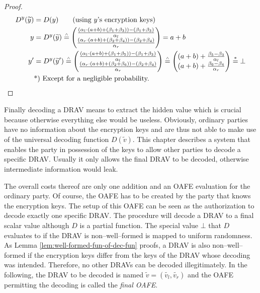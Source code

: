 \begin{proof}
  \begin{align*}
    D^y(\widetilde{y}) &= D(y) \qquad\text{(using $y$'s encryption keys)}\\
    y &= D^y(\widetilde{y}) \stackrel{\scriptscriptstyle\wedge}{=}
    \begin{pmatrix}
      \frac{(\alpha_l \cdot (a+b) + (\beta_1 + \beta_3)) - (\beta_1+\beta_3)}
           {\alpha_l}\\
      \frac{(\alpha_r \cdot (a+b) + (\beta_2 + \beta_4)) - (\beta_2+\beta_4)}
           {\alpha_r}\\
    \end{pmatrix}
    = a+b\\
    y' &= D^y(\widetilde{y}')
    \stackrel{\scriptscriptstyle\wedge}{=}
    \begin{pmatrix}
      \frac{(\alpha_l \cdot (a+b) + (\beta_1 + \beta_5)) - (\beta_1+\beta_3)}
           {\alpha_l}\\
      \frac{(\alpha_r \cdot (a+b) + (\beta_2 + \beta_6)) - (\beta_2+\beta_4)}
           {\alpha_r}\\
    \end{pmatrix}
    \stackrel{\scriptscriptstyle\wedge}{=}
    \begin{pmatrix}
      (a+b) +
      \frac{\beta_5 - \beta_3}{\alpha_l}\\
      (a+b) +
      \frac{\beta_6 - \beta_4}{\alpha_r}\\
    \end{pmatrix}
    \stackrel{*}{=} \bot\\
    &\text{*) Except for a negligible probability.}{}
  \end{align*}
\end{proof}


\label{sec:drav-final-decoding}

Finally decoding a DRAV means to extract the hidden value which is crucial
because otherwise everything else would be useless. Obviously, ordinary parties
have no information about the encryption keys and are thus not able to make use
of the universal decoding function $D(\widetilde{v})$. This chapter describes a
system that enables the party in possession of the keys to allow other parties
to decode a specific DRAV\@. Usually it only allows the final DRAV to be
decoded, otherwise intermediate information would leak.

The overall costs thereof are only one addition and an OAFE evaluation for the
ordinary party. Of course, the OAFE has to be created by the party that knows
the encryption keys. The setup of this OAFE can be seen as the authorization to
decode exactly one specific DRAV\@. The procedure will decode a DRAV to a final
scalar value although $D$ is a partial function. The special value $\bot$ that
$D$ evaluates to if the DRAV is non--well--formed is mapped to uniform
randomness. As Lemma \ref{lem:well-formed-fun-of-dec-fun} proofs, a DRAV is
also non--well--formed if the encryption keys differ from the keys of the DRAV
whose decoding was intended. Therefore, no other DRAVs can be decoded
illegitimately. In the following, the DRAV to be decoded is named $\widetilde{v}
= (\widetilde{v_l}, \widetilde{v_r})$ and the OAFE permitting the decoding is
called the \emph{final OAFE}.

